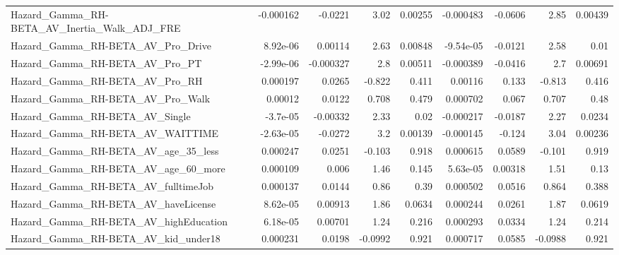 \begin{tabular}{lrrrrrrrr}
Hazard\_Gamma\_RH-BETA\_AV\_Inertia\_Walk\_ADJ\_FRE       &   -0.000162 &      -0.0221 &     3.02 &  0.00255 &  -0.000483 &     -0.0606 &         2.85 &       0.00439 \\
Hazard\_Gamma\_RH-BETA\_AV\_Pro\_Drive                  &    8.92e-06 &      0.00114 &     2.63 &  0.00848 &  -9.54e-05 &     -0.0121 &         2.58 &          0.01 \\
Hazard\_Gamma\_RH-BETA\_AV\_Pro\_PT                     &   -2.99e-06 &    -0.000327 &      2.8 &  0.00511 &  -0.000389 &     -0.0416 &          2.7 &       0.00691 \\
Hazard\_Gamma\_RH-BETA\_AV\_Pro\_RH                     &    0.000197 &       0.0265 &   -0.822 &    0.411 &    0.00116 &       0.133 &       -0.813 &         0.416 \\
Hazard\_Gamma\_RH-BETA\_AV\_Pro\_Walk                   &     0.00012 &       0.0122 &    0.708 &    0.479 &   0.000702 &       0.067 &        0.707 &          0.48 \\
Hazard\_Gamma\_RH-BETA\_AV\_Single                     &    -3.7e-05 &     -0.00332 &     2.33 &     0.02 &  -0.000217 &     -0.0187 &         2.27 &        0.0234 \\
Hazard\_Gamma\_RH-BETA\_AV\_WAITTIME                   &   -2.63e-05 &      -0.0272 &      3.2 &  0.00139 &  -0.000145 &      -0.124 &         3.04 &       0.00236 \\
Hazard\_Gamma\_RH-BETA\_AV\_age\_35\_less                &    0.000247 &       0.0251 &   -0.103 &    0.918 &   0.000615 &      0.0589 &       -0.101 &         0.919 \\
Hazard\_Gamma\_RH-BETA\_AV\_age\_60\_more                &    0.000109 &        0.006 &     1.46 &    0.145 &   5.63e-05 &     0.00318 &         1.51 &          0.13 \\
Hazard\_Gamma\_RH-BETA\_AV\_fulltimeJob                &    0.000137 &       0.0144 &     0.86 &     0.39 &   0.000502 &      0.0516 &        0.864 &         0.388 \\
Hazard\_Gamma\_RH-BETA\_AV\_haveLicense                &    8.62e-05 &      0.00913 &     1.86 &   0.0634 &   0.000244 &      0.0261 &         1.87 &        0.0619 \\
Hazard\_Gamma\_RH-BETA\_AV\_highEducation              &    6.18e-05 &      0.00701 &     1.24 &    0.216 &   0.000293 &      0.0334 &         1.24 &         0.214 \\
Hazard\_Gamma\_RH-BETA\_AV\_kid\_under18                &    0.000231 &       0.0198 &  -0.0992 &    0.921 &   0.000717 &      0.0585 &      -0.0988 &         0.921 \\

\end{tabular}
